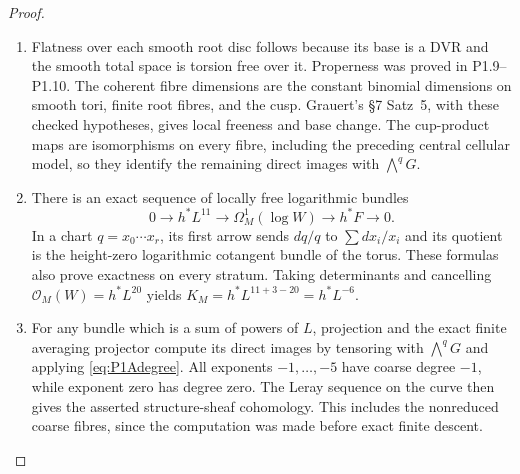 \documentclass[11pt,a4paper]{article}
\theoremstyle{definition}
\begin{document}
\begin{proof}
\begin{enumerate}[label=\arabic*.]
\item Flatness over each smooth root disc follows because its base is a
DVR and the smooth total space is torsion free over it. Properness
was proved in P1.9--P1.10. The coherent fibre dimensions are the
constant binomial dimensions on smooth tori, finite root fibres,
and the cusp. Grauert's \S7 Satz~5, with these checked hypotheses,
gives local freeness and base change. The cup-product maps are
isomorphisms on every fibre, including the preceding central
cellular model, so they identify the remaining direct images with
$\bigwedge^qG$.

\item There is an exact sequence of locally free logarithmic bundles
\begin{equation}\label{eq:P1Alogcotangent}
0\longrightarrow h^*L^{11}\longrightarrow\Omega_M^1(\log W)
 \longrightarrow h^*F\longrightarrow0.
\end{equation}
In a chart $q=x_0\cdots x_r$, its first arrow sends
$dq/q$ to $\sum dx_i/x_i$ and its quotient is the height-zero
logarithmic cotangent bundle of the torus. These formulas also
prove exactness on every stratum. Taking determinants and
cancelling $\mathcal O_M(W)=h^*L^{20}$ yields
$K_M=h^*L^{11+3-20}=h^*L^{-6}$.

\item For any bundle which is a sum of powers of $L$, projection and
the exact finite averaging projector compute its direct images
by tensoring with $\bigwedge^qG$ and applying
\eqref{eq:P1Adegree}. All exponents $-1,\ldots,-5$ have coarse
degree $-1$, while exponent zero has degree zero. The Leray
sequence on the curve then gives the asserted structure-sheaf
cohomology. This includes the nonreduced coarse fibres, since
the computation was made before exact finite descent.

\end{enumerate}
\end{proof}
\end{document}
